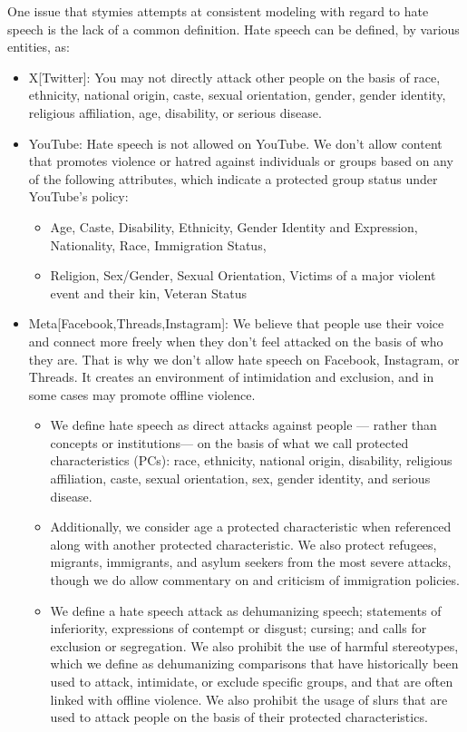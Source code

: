 \documentclass[conference]{IEEEtran}
\begin{document}
One issue that stymies attempts at consistent modeling with regard to hate speech is the lack of a common definition. Hate speech can be defined, by various entities, as:
\begin{itemize}
    \item X[Twitter]: You may not directly attack other people on the basis of race, ethnicity, national origin, caste, sexual orientation, gender, gender identity, religious affiliation, age, disability, or serious disease\cite{b23}.
    \item YouTube: Hate speech is not allowed on YouTube. We don’t allow content that promotes violence or hatred against individuals or groups based on any of the following attributes, which indicate a protected group status under YouTube’s policy:
    \begin{itemize}
        \item Age, Caste, Disability, Ethnicity, Gender Identity and Expression, Nationality, Race, Immigration Status, 
        \item Religion, Sex/Gender, Sexual Orientation, Victims of a major violent event and their kin, Veteran Status\cite{b24}
    \end{itemize}
    \item Meta[Facebook,Threads,Instagram]: We believe that people use their voice and connect more freely when they don’t feel attacked on the basis of who they are. That is why we don’t allow hate speech on Facebook, Instagram, or Threads. It creates an environment of intimidation and exclusion, and in some cases may promote offline violence.
    \begin{itemize} 
        \item We define hate speech as direct attacks against people — rather than concepts or institutions— on the basis of what we call protected characteristics (PCs): race, ethnicity, national origin, disability, religious affiliation, caste, sexual orientation, sex, gender identity, and serious disease.
        \item Additionally, we consider age a protected characteristic when referenced along with another protected characteristic. We also protect refugees, migrants, immigrants, and asylum seekers from the most severe attacks, though we do allow commentary on and criticism of immigration policies.    \item We define a hate speech attack as dehumanizing speech; statements of inferiority, expressions of contempt or disgust; cursing; and calls for exclusion or segregation. We also prohibit the use of harmful stereotypes, which we define as dehumanizing comparisons that have historically been used to attack, intimidate, or exclude specific groups, and that are often linked with offline violence. We also prohibit the usage of slurs that are used to attack people on the basis of their protected characteristics\cite{b25}.

\end{itemize}
\end{itemize}
\end{document}
